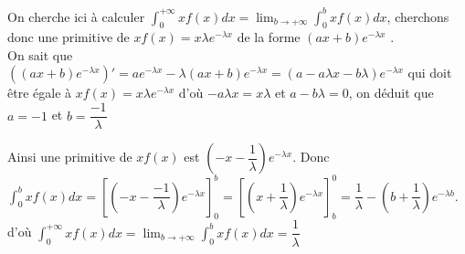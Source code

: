 \documentclass[french]{book}
\newcommand{\cro}[1]{[#1]}
\newcommand{\dx}{dx}
\begin{document}
\begin{demo}
On cherche ici à calculer $\int_{0}^{+ \infty}xf(x)\dx =  \lim_{b\rightarrow +\infty}\int_{0}^{b}xf(x)\dx$, cherchons donc une primitive de $xf(x)=x\lambda e^{-\lambda x}$ de la forme $(ax+b)e^{-\lambda x}$ .\\

On sait que $((ax+b)e^{-\lambda x})'=ae^{-\lambda x}-\lambda(ax+b)e^{-\lambda x}=(a-a\lambda x-b\lambda)e^{-\lambda x}$ qui doit être égale à $xf(x)=x\lambda e^{-\lambda x}$ d'où $-a\lambda x=x\lambda$ et $a-b\lambda=0$, on déduit que $a=-1$ et $b=\dfrac{-1}{\lambda}$

Ainsi une primitive de $xf(x)$ est $(-x-\dfrac{1}{\lambda})e^{-\lambda x}$. Donc $\int_{0}^{b}xf(x)\dx=\cro{(-x-\dfrac{-1}{\lambda})e^{-\lambda x}}_0^b=\cro{(x+\dfrac{1}{\lambda})e^{-\lambda x}}_b^0=\dfrac{1}{\lambda}-(b+\dfrac{1}{\lambda})e^{-\lambda b}$. \\

d'où $\int_{0}^{+ \infty}xf(x)\dx =  \lim_{b\rightarrow +\infty}\int_{0}^{b}xf(x)\dx=\dfrac{1}{\lambda}$
 

\end{demo}
\end{document}
